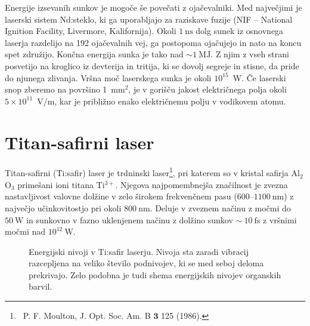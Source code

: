 \begin{remark}
Energije izsevanih sunkov je mogoče še povečati z ojačevalniki. Med največjimi je
laserski sistem Nd:steklo, ki ga uporabljajo za raziskave fuzije (NIF -- National Ignition Facility, 
Livermore, Kalifornija).
Okoli $1~\si{\nano\second}$ dolg sunek iz osnovnega laserja razdelijo na 192
ojačevalnih vej, ga postopoma ojačujejo in nato na koncu spet združijo.
Končna energija sunka je tako nad $\sim 1~\si{\mega\joule}$. Z njim z vseh strani posvetijo na
kroglico iz devterija in tritija, ki se dovolj segreje in stisne, da pride do 
njunega zlivanja. Vršna moč laserskega sunka je okoli $10^{15}$~W. 
Če laserski snop zberemo na površino 1~mm$^2$, je v gorišču jakost električnega polja
okoli $5 \times 10^{11}$~V/m, kar je približno enako električnemu polju v vodikovem atomu.
\end{remark}

\section{Titan-safirni laser}
Titan-safirni (Ti:safir) laser je trdninski laser\footnote{~P. F. Moulton, J. Opt. Soc. Am. B $\mathbf{3}$
125 (1986).}, pri katerem so v kristal safirja
Al$_2$O$_3$ primešani ioni titana Ti$^{3+}$. Njegova najpomembnejša značilnost je
zvezna nastavljivost valovne dolžine v zelo širokem frekvenčnem pasu 
($600$--$1100~\si{\nano\metre}$) z največjo učinkovitostjo pri okoli $800~\si{\nano\metre}$. Deluje
v zveznem načinu z močmi do $50~\si{\watt}$ in sunkovno  v fazno uklenjenem načinu 
z dolžino sunkov $\sim~10~\si{\femto\second}$ z vršnimi močmi nad $10^{12}~\si{\watt}$. 
\begin{figure}[ht]
\centering
\def\svgwidth{90truemm} 

\caption{Energijski nivoji v Ti:safir laserju. Nivoja sta zaradi vibracij
razcepljena na veliko število podnivojev, ki se med seboj deloma prekrivajo.
Zelo podobna je tudi shema energijskih nivojev organskih barvil. 
}
\label{fig:TiE}
\end{figure} 

